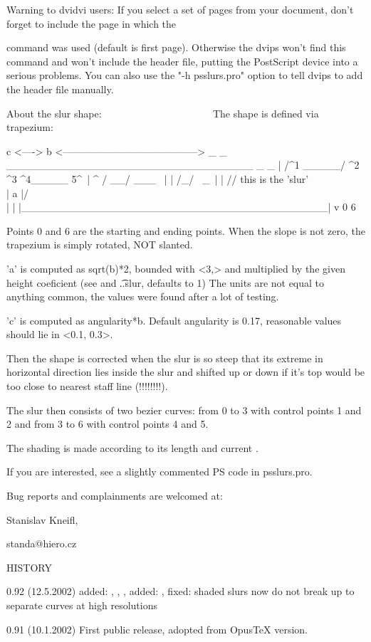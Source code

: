 Warning to dvidvi users: If you select a set of pages from your document,
don't forget to include the page in which the \special command was used
(default is first page). Otherwise the dvips won't find this command and
won't include the header file, putting the PostScript device into a serious
problems. You can also use the "-h psslurs.pro" option to tell dvips to add
the header file manually.


About the slur shape:
~~~~~~~~~~~~~~~~~~~~~
The shape is defined via trapezium:

       c
    <---->               b
    <----------------------------------------->
     _ _ _________________________________ _ _
    |    /^1 _____/  ^2  ^3  ^4\_____  5^\    | ^
        / __/                        \___ \     |
    |  /_/  \                            \_\  | |
      //     this is the 'slur'            \\   | a
    |/                                      \\| |
    |_________________________________________| v
    0                                         6

Points 0 and 6 are the starting and ending points. When the slope is not
zero, the trapezium is simply rotated, NOT slanted.

'a' is computed as sqrt(b)*2, bounded with <3,\psslurmaxhgt> and multiplied
by the given height coeficient (see \tSlur and \t..slur, defaults to 1)
The units are not equal to anything common, the values were found
after a lot of testing.

'c' is computed as angularity*b. Default angularity is 0.17, reasonable
values should lie in <0.1, 0.3>.

Then the shape is corrected when the slur is so steep that its extreme
in horizontal direction lies inside the slur and shifted up or down
if it's top would be too close to nearest staff line (!!!!!!!!).

The slur then consists of two bezier curves:
from 0 to 3 with control points 1 and 2 and
from 3 to 6 with control points 4 and 5.

The shading is made according to its length and current \internote.



If you are interested, see a slightly commented PS code in psslurs.pro.

Bug reports and complainments are welcomed at:

	Stanislav Kneifl,

	standa@hiero.cz



HISTORY
~~~~~~~

0.92 (12.5.2002)
      added: \nosluradjust, \sluradjust, \notieadjust, \tieadjust
      added: \slopebrkslurtrue, \slopebrkslurfalse
      fixed: shaded slurs now do not break up to separate curves
             at high resolutions

0.91 (10.1.2002)
     First public release, adopted from OpusTeX version.
